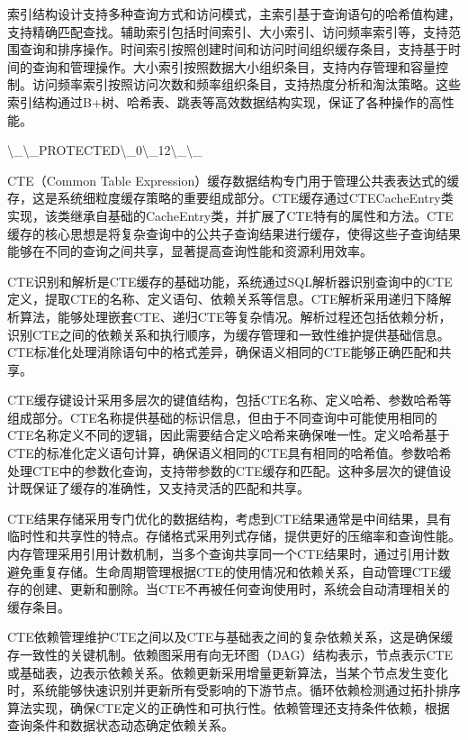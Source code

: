 索引结构设计支持多种查询方式和访问模式，主索引基于查询语句的哈希值构建，支持精确匹配查找。辅助索引包括时间索引、大小索引、访问频率索引等，支持范围查询和排序操作。时间索引按照创建时间和访问时间组织缓存条目，支持基于时间的查询和管理操作。大小索引按照数据大小组织条目，支持内存管理和容量控制。访问频率索引按照访问次数和频率组织条目，支持热度分析和淘汰策略。这些索引结构通过B+树、哈希表、跳表等高效数据结构实现，保证了各种操作的高性能。

\textbackslash{}_\textbackslash{}_PROTECTED\textbackslash{}_0\textbackslash{}_12\textbackslash{}_\textbackslash{}_

CTE（Common Table Expression）缓存数据结构专门用于管理公共表表达式的缓存，这是系统细粒度缓存策略的重要组成部分。CTE缓存通过CTECacheEntry类实现，该类继承自基础的CacheEntry类，并扩展了CTE特有的属性和方法。CTE缓存的核心思想是将复杂查询中的公共子查询结果进行缓存，使得这些子查询结果能够在不同的查询之间共享，显著提高查询性能和资源利用效率。

CTE识别和解析是CTE缓存的基础功能，系统通过SQL解析器识别查询中的CTE定义，提取CTE的名称、定义语句、依赖关系等信息。CTE解析采用递归下降解析算法，能够处理嵌套CTE、递归CTE等复杂情况。解析过程还包括依赖分析，识别CTE之间的依赖关系和执行顺序，为缓存管理和一致性维护提供基础信息。CTE标准化处理消除语句中的格式差异，确保语义相同的CTE能够正确匹配和共享。

CTE缓存键设计采用多层次的键值结构，包括CTE名称、定义哈希、参数哈希等组成部分。CTE名称提供基础的标识信息，但由于不同查询中可能使用相同的CTE名称定义不同的逻辑，因此需要结合定义哈希来确保唯一性。定义哈希基于CTE的标准化定义语句计算，确保语义相同的CTE具有相同的哈希值。参数哈希处理CTE中的参数化查询，支持带参数的CTE缓存和匹配。这种多层次的键值设计既保证了缓存的准确性，又支持灵活的匹配和共享。

CTE结果存储采用专门优化的数据结构，考虑到CTE结果通常是中间结果，具有临时性和共享性的特点。存储格式采用列式存储，提供更好的压缩率和查询性能。内存管理采用引用计数机制，当多个查询共享同一个CTE结果时，通过引用计数避免重复存储。生命周期管理根据CTE的使用情况和依赖关系，自动管理CTE缓存的创建、更新和删除。当CTE不再被任何查询使用时，系统会自动清理相关的缓存条目。

CTE依赖管理维护CTE之间以及CTE与基础表之间的复杂依赖关系，这是确保缓存一致性的关键机制。依赖图采用有向无环图（DAG）结构表示，节点表示CTE或基础表，边表示依赖关系。依赖更新采用增量更新算法，当某个节点发生变化时，系统能够快速识别并更新所有受影响的下游节点。循环依赖检测通过拓扑排序算法实现，确保CTE定义的正确性和可执行性。依赖管理还支持条件依赖，根据查询条件和数据状态动态确定依赖关系。

